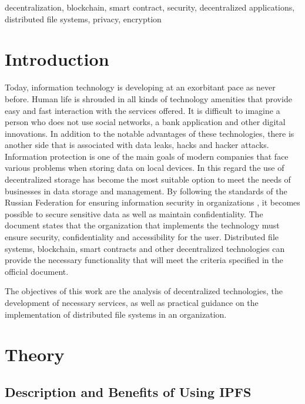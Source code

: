\documentclass[10pt,conference,a4paper]{IEEEtran_EDM}
\begin{document}
\begin{IEEEkeywords}
decentralization, blockchain, smart contract, security, decentralized applications, distributed file systems, privacy, encryption
\end{IEEEkeywords}

\section{Introduction}
Today, information technology is developing at an exorbitant pace as never before.
Human life is shrouded in all kinds of technology amenities that provide easy and fast interaction with the services offered.
It is difficult to imagine a person who does not use social networks, a bank application and other digital innovations.
In addition to the notable advantages of these technologies, there is another side that is associated with data leaks, hacks and hacker attacks.
Information protection is one of the main goals of modern companies that face various problems when storing data on local devices.
In this regard the use of decentralized storage has become the most suitable option to meet the needs of businesses in data storage and management.
By following the standards of the Russian Federation for ensuring information security in organizations \cite{GOST53114}, it becomes possible to secure sensitive data as well as maintain confidentiality.
The document states that the organization that implements the technology must ensure security, confidentiality and accessibility for the user.
Distributed file systems, blockchain, smart contracts and other decentralized technologies can provide the necessary functionality that will meet the criteria specified in the official document.

The objectives of this work are the analysis of decentralized technologies, the development of necessary services, as well as practical guidance on the implementation of distributed file systems in an organization.

\section{Theory}

\subsection{Description and Benefits of Using IPFS}
\end{document}
